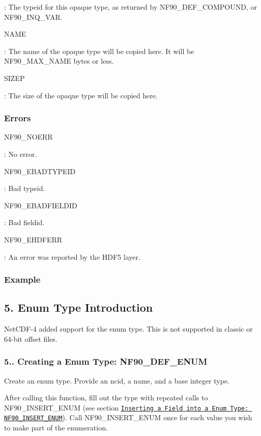 \+: The typeid for this opaque type, as returned by N\+F90\+\_\+\+D\+E\+F\+\_\+\+C\+O\+M\+P\+O\+U\+ND, or N\+F90\+\_\+\+I\+N\+Q\+\_\+\+V\+AR.

{\ttfamily N\+A\+ME}

\+: The name of the opaque type will be copied here. It will be N\+F90\+\_\+\+M\+A\+X\+\_\+\+N\+A\+ME bytes or less.

{\ttfamily S\+I\+Z\+EP}

\+: The size of the opaque type will be copied here.

\subsubsection*{Errors}

{\ttfamily N\+F90\+\_\+\+N\+O\+E\+RR}

\+: No error.

{\ttfamily N\+F90\+\_\+\+E\+B\+A\+D\+T\+Y\+P\+E\+ID}

\+: Bad typeid.

{\ttfamily N\+F90\+\_\+\+E\+B\+A\+D\+F\+I\+E\+L\+D\+ID}

\+: Bad fieldid.

{\ttfamily N\+F90\+\_\+\+E\+H\+D\+F\+E\+RR}

\+: An error was reported by the H\+D\+F5 layer.

\subsubsection*{Example}\hypertarget{f90-user-defined-data-types_f90-enum-type-introduction}{}\subsection{5. Enum Type Introduction }\label{f90-user-defined-data-types_f90-enum-type-introduction}
Net\+C\+D\+F-\/4 added support for the enum type. This is not supported in classic or 64-\/bit offset files.\hypertarget{f90-user-defined-data-types_f90-creating-a-enum-type-nf90_def_enum}{}\subsubsection{5.. Creating a Enum Type\+: N\+F90\+\_\+\+D\+E\+F\+\_\+\+E\+N\+UM}\label{f90-user-defined-data-types_f90-creating-a-enum-type-nf90_def_enum}
Create an enum type. Provide an ncid, a name, and a base integer type.

After calling this function, fill out the type with repeated calls to N\+F90\+\_\+\+I\+N\+S\+E\+R\+T\+\_\+\+E\+N\+UM (see section \href{#NF90_005fINSERT_005fENUM}{\tt Inserting a Field into a Enum Type\+: N\+F90\+\_\+\+I\+N\+S\+E\+R\+T\+\_\+\+E\+N\+UM}). Call N\+F90\+\_\+\+I\+N\+S\+E\+R\+T\+\_\+\+E\+N\+UM once for each value you wish to make part of the enumeration.

